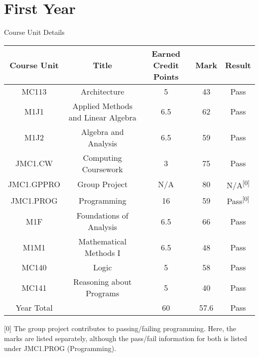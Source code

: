 \documentclass[11pt]{article}
\begin{document}
\section{First Year}

Course Unit Details

\begin{center}
    \begin{tabular}{|c|c|c|c|c|}
    \hline
        Course Unit & Title & Earned Credit Points & Mark & Result \\
    \hline \hline
        MC113 & Architecture & 5 & 43 & Pass \\
    \hline  
        M1J1 & Applied Methods and Linear Algebra & 6.5 & 62 & Pass \\
    \hline  
        M1J2 & Algebra and Analysis & 6.5 & 59 & Pass \\
    \hline  
        JMC1.CW & Computing Coursework & 3 & 75 & Pass \\
    \hline  
        JMC1.GPPRO & Group Project & N/A & 80 & N/A\textsuperscript{[0]} \\
    \hline  
        JMC1.PROG & Programming & 16 & 59 & Pass\textsuperscript{[0]} \\
    \hline  
        M1F & Foundations of Analysis & 6.5 & 66 & Pass \\
    \hline  
        M1M1 & Mathematical Methods I & 6.5 & 48 & Pass \\
    \hline
        MC140 & Logic & 5 & 58 & Pass \\
    \hline  
        MC141 & Reasoning about Programs & 5 & 40 & Pass \\
    \hline \hline
        Year Total & & 60 & 57.6 & Pass \\
    \hline
    \end{tabular}
\end{center}

[0] The group project contributes to passing/failing programming. Here, the marks are listed separately, although the pass/fail information for both is listed under JMC1.PROG (Programming).
\end{document}
